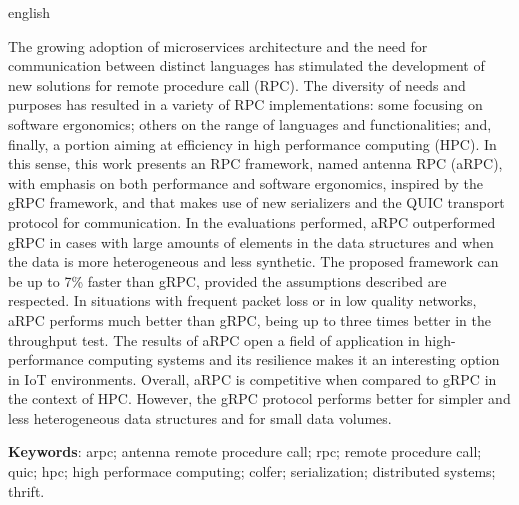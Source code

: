 \begin{resumo}[Abstract]
\begin{otherlanguage*}{english}
\begin{SingleSpace}
The growing adoption of microservices architecture and the need for communication between distinct languages has stimulated the development of new solutions for remote procedure call (RPC). The diversity of needs and purposes has resulted in a variety of RPC implementations: some focusing on software ergonomics; others on the range of languages and functionalities; and, finally, a portion aiming at efficiency in high performance computing (HPC). In this sense, this work presents an RPC framework, named antenna RPC (aRPC), with emphasis on both performance and software ergonomics, inspired by the gRPC framework, and that makes use of new serializers and the QUIC transport protocol for communication. 
In the evaluations performed, aRPC outperformed gRPC in cases with large amounts of elements in the data structures and when the data is more heterogeneous and less synthetic. The proposed framework can be up to 7\% faster than gRPC, provided the assumptions described are respected. In situations with frequent packet loss or in low quality networks, aRPC performs much better than gRPC, being up to three times better in the throughput test. The results of aRPC open a field of application in high-performance computing systems and its resilience makes it an interesting option in IoT environments. Overall, aRPC is competitive when compared to gRPC in the context of HPC. However, the gRPC protocol performs better for simpler and less heterogeneous data structures and for small data volumes.
\end{SingleSpace}

\vspace{\onelineskip}
\textbf{Keywords}: arpc; antenna remote procedure call; rpc; remote procedure call; quic; hpc; high performace computing; colfer; serialization; distributed systems; thrift.
\end{otherlanguage*}
\end{resumo}

